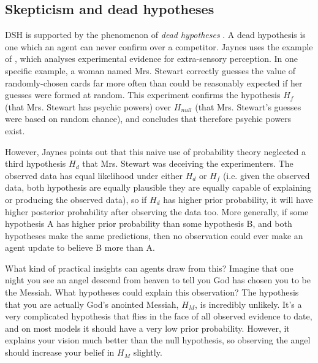 \documentclass{article}
\begin{document}
\subsection{Skepticism and dead hypotheses}

DSH is supported by the phenomenon of \textit{dead hypotheses} \citep{jaynes2003probability}. A dead hypothesis is one which an agent can never confirm over a competitor. Jaynes uses the example of \citet{soal1954modern}, which analyses experimental evidence for extra-sensory perception. In one specific example, a woman named Mrs. Stewart correctly guesses the value of randomly-chosen cards far more often than could be reasonably expected if her guesses were formed at random. This experiment confirms the hypothesis \(H_{f}\) (that Mrs. Stewart has psychic powers) over \(H_{null}\) (that Mrs. Stewart's guesses were based on random chance), and concludes that therefore psychic powers exist. 

However, Jaynes points out that this naive use of probability theory neglected a third hypothesis \(H_{d}\) \textemdash{} that Mrs. Stewart was deceiving the experimenters. The observed data has equal likelihood under either \(H_{d}\) or \(H_{f}\) (i.e. given the observed data, both hypothesis are equally plausible \textemdash{} they are equally capable of explaining or producing the observed data), so if \(H_{d}\) has higher prior probability, it will have higher posterior probability after observing the data too. More generally, if some hypothesis A has higher prior probability than some hypothesis B, and both hypotheses make the same predictions, then no observation could ever make an agent update to believe B more than A. 

What kind of practical insights can agents draw from this? Imagine that one night you see an angel descend from heaven to tell you God has chosen you to be the Messiah. What hypotheses could explain this observation? The hypothesis that you are actually God's anointed Messiah, \(H_{M}\), is incredibly unlikely. It's a very complicated hypothesis that flies in the face of all observed evidence to date, and on most models it should have a very low prior probability. However, it explains your vision much better than the null hypothesis, so observing the angel should increase your belief in \(H_{M}\) slightly.
\end{document}
